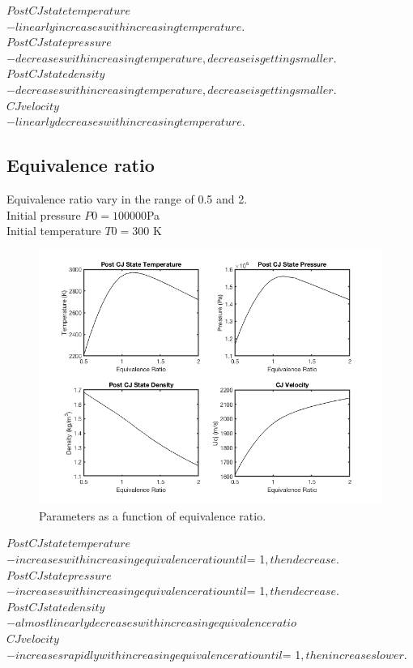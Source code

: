 \documentclass[a4paper]{article}
\newcommand{\sepspace}{\vspace*{1em}}
\begin{document}
\noindent
\circ $ Post CJ state temperature$\\ 
\indent $- linearly increases with increasing temperature.$\\
\circ $ Post CJ state pressure$\\
\indent $- decreases with increasing temperature, decrease is getting smaller.$\\
\circ $ Post CJ state density$\\
\indent $- decreases with increasing temperature, decrease is getting smaller.$\\
\circ $ CJ velocity$\\
\indent $- linearly decreases with increasing temperature.$\\

\pagebreak

\subsection{Equivalence ratio}
\sepspace

Equivalence ratio vary in the range of 0.5 and 2.\\
Initial pressure $P0 = 100 000$Pa\\
Initial temperature $T0 = 300$ K

\begin{figure}[h!]
\centering
\includegraphics[width=1\textwidth]{F.png}
\caption{\label{fig:1}Parameters as a function of equivalence ratio.}
\end{figure}

\noindent
\circ $ Post CJ state temperature$\\ 
\indent $- increases with increasing equivalence ratio until $\Phi = 1$, then decrease. $\\
\circ $ Post CJ state pressure$\\
\indent $- increases with increasing equivalence ratio until $\Phi = 1$, then decrease. $\\
\circ $ Post CJ state density$\\
\indent $- almost linearly decreases with increasing equivalence ratio$\\
\circ $ CJ velocity$\\
\indent $- increases rapidly with increasing equivalence ratio until $\Phi = 1$, then increase slower. $\\
\end{document}
